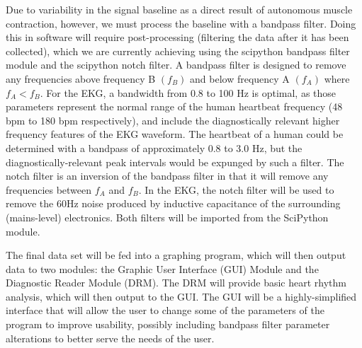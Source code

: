 \documentclass[11pt, oneside]{article}   	%
\begin{document}
\par 
Due to variability in the signal baseline as a direct result of autonomous muscle contraction, however, we must process the baseline with a bandpass filter. \cite{karptalk} Doing this in software will require post-processing (filtering the data after it has been collected), which we are currently achieving using the scipython bandpass filter module and the scipython notch filter. A bandpass filter is designed to remove any frequencies above frequency B $(f_B)$ and below frequency A $(f_A)$ where $f_A < f_B$. For the EKG, a bandwidth from 0.8 to 100 Hz is optimal, as those parameters represent the normal range of the human heartbeat frequency (48 bpm to 180 bpm respectively), and include the diagnostically relevant higher frequency features of the EKG waveform. The heartbeat of a human could be determined with a bandpass of approximately 0.8 to 3.0 Hz, but the diagnostically-relevant peak intervals would be expunged by such a filter. The notch filter is an inversion of the bandpass filter in that it will remove any frequencies between $f_A$ and $f_B$. In the EKG, the notch filter will be used to remove the 60Hz noise produced by inductive capacitance of the surrounding (mains-level) electronics. Both filters will be imported from the SciPython module. \cite{SciPython}    

The final data set will be fed into a graphing program, which will then output data to two modules: the Graphic User Interface (GUI) Module and the Diagnostic Reader Module (DRM). The DRM will provide basic heart rhythm analysis, which will then output to the GUI. The GUI will be a highly-simplified interface that will allow the user to change some of the parameters of the program to improve usability, possibly including bandpass filter parameter alterations to better serve the needs of the user.
\pagebreak
\end{document}
